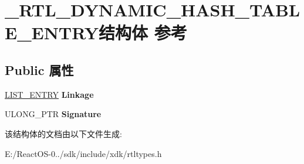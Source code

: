 \hypertarget{struct___r_t_l___d_y_n_a_m_i_c___h_a_s_h___t_a_b_l_e___e_n_t_r_y}{}\section{\+\_\+\+R\+T\+L\+\_\+\+D\+Y\+N\+A\+M\+I\+C\+\_\+\+H\+A\+S\+H\+\_\+\+T\+A\+B\+L\+E\+\_\+\+E\+N\+T\+R\+Y结构体 参考}
\label{struct___r_t_l___d_y_n_a_m_i_c___h_a_s_h___t_a_b_l_e___e_n_t_r_y}
\subsection*{Public 属性}
\begin{DoxyCompactItemize}
\item 
\mbox{\label{struct___r_t_l___d_y_n_a_m_i_c___h_a_s_h___t_a_b_l_e___e_n_t_r_y_a94c4f34ed2fc817d4be850014cdec04b}} 
\hyperlink{struct___l_i_s_t___e_n_t_r_y}{L\+I\+S\+T\+\_\+\+E\+N\+T\+RY} {\bfseries Linkage}
\item 
\mbox{\label{struct___r_t_l___d_y_n_a_m_i_c___h_a_s_h___t_a_b_l_e___e_n_t_r_y_a435c69088113090b7793fabe87b91075}} 
U\+L\+O\+N\+G\+\_\+\+P\+TR {\bfseries Signature}
\end{DoxyCompactItemize}


该结构体的文档由以下文件生成\+:\begin{DoxyCompactItemize}
\item 
E\+:/\+React\+O\+S-\/0../sdk/include/xdk/rtltypes.\+h\end{DoxyCompactItemize}
